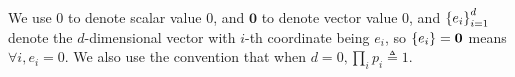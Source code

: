 We use $0$ to denote scalar value $0$, and $\mathbf{0}$ to denote vector value 0, and $\left\{e_i\right\}_{i=1}^{d}$ denote the $d$-dimensional vector with $i$-th coordinate being $e_i$, so $\left\{e_i\right\} = \mathbf{0}$ means $\forall i, e_i = 0$.
We also use the convention that when $d=0, \prod_i p_i \triangleq 1$.
